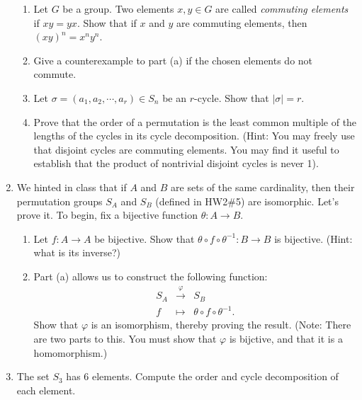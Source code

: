 \documentclass[11pt]{article}
\begin{document}
\begin{enumerate}
  \begin{enumerate}
    \item Let $G$ be a group.  Two elements $x,y\in G$ are called \textit{commuting elements} if $xy = yx$.  Show that if $x$ and $y$ are commuting elements, then $(xy)^n = x^ny^n$.
    \item Give a counterexample to part (a) if the chosen elements do not commute.
    \item Let $\sigma = (a_1,a_2,\cdots,a_r)\in S_n$ be an $r$-cycle.  Show that $|\sigma| = r$.
    \item Prove that the order of a permutation is the least common multiple of the lengths of the cycles in its cycle decomposition.  (Hint: You may freely use that disjoint cycles are commuting elements.  You may find it useful to establish that the product of nontrivial disjoint cycles is never 1).
  \end{enumerate}
  \item We hinted in class that if $A$ and $B$ are sets of the same cardinality, then their permutation groups $S_A$ and $S_B$ (defined in HW2\#5) are isomorphic.  Let's prove it.  To begin, fix a bijective function $\theta:A\to B$.
  \begin{enumerate}
    \item Let $f:A\to A$ be bijective.  Show that $\theta\circ f\circ \theta^{-1}:B\to B$ is bijective.  (Hint: what is its inverse?)
    \item Part (a) allows us to construct the following function:
    \begin{eqnarray*}
      S_A&\stackrel{\varphi}{\longrightarrow}&S_B\\
      f&\longmapsto&\theta\circ f\circ\theta^{-1}.
    \end{eqnarray*}
    Show that $\varphi$ is an isomorphism, thereby proving the result.  (Note: There are two parts to this.  You must show that $\varphi$ is bijctive, and that it is a homomorphism.)
  \end{enumerate}
  \item The set $S_3$ has 6 elements.  Compute the order and cycle decomposition of each element.
\end{enumerate}
\end{document}
